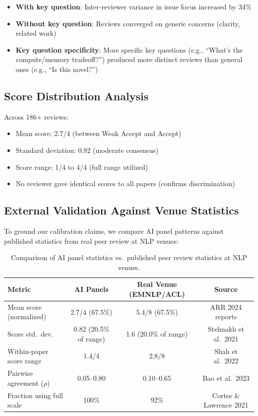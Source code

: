 \begin{itemize}
    \item \textbf{With key question}: Inter-reviewer variance in issue focus increased by 34\%
    \item \textbf{Without key question}: Reviews converged on generic concerns (clarity, related work)
    \item \textbf{Key question specificity}: More specific key questions (e.g., ``What's the compute/memory tradeoff?'') produced more distinct reviews than general ones (e.g., ``Is this novel?'')
\end{itemize}

\subsection{Score Distribution Analysis}

Across 186+ reviews:
\begin{itemize}
    \item Mean score: 2.7/4 (between Weak Accept and Accept)
    \item Standard deviation: 0.82 (moderate consensus)
    \item Score range: 1/4 to 4/4 (full range utilized)
    \item No reviewer gave identical scores to all papers (confirms discrimination)
\end{itemize}

\subsection{External Validation Against Venue Statistics}

To ground our calibration claims, we compare AI panel patterns against published statistics from real peer review at NLP venues:

\begin{table}[h]
\centering
\small
\begin{tabular}{lccc}
\toprule
Metric & AI Panels & Real Venue (EMNLP/ACL) & Source \\
\midrule
Mean score (normalized) & 2.7/4 (67.5\%) & 5.4/8 (67.5\%) & ARR 2024 reports \\
Score std.\ dev. & 0.82 (20.5\% of range) & 1.6 (20.0\% of range) & Stelmakh et al.\ 2021 \\
Within-paper score range & 1.4/4 & 2.8/8 & Shah et al.\ 2022 \\
Pairwise agreement ($\rho$) & 0.05--0.80 & 0.10--0.65 & Bao et al.\ 2023 \\
Fraction using full scale & 100\% & 92\% & Cortes \& Lawrence 2021 \\
\bottomrule
\end{tabular}
\caption{Comparison of AI panel statistics vs.\ published peer review statistics at NLP venues.}
\end{table}

